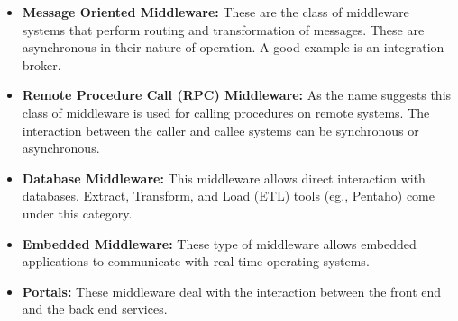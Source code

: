 \begin{itemize}
  \item \textbf{Message Oriented Middleware:} These are the class of middleware systems that perform routing and transformation of messages. These are asynchronous in their nature of operation. A good example is an integration broker. 

  \item \textbf{Remote Procedure Call (RPC) Middleware:} As the name suggests this class of middleware is used for calling procedures on remote systems. The interaction between the caller and callee systems can be synchronous or asynchronous.

  \item \textbf{Database Middleware:} This middleware allows direct interaction with databases. Extract, Transform, and Load (ETL) tools (eg., Pentaho) come under this category.

  \item \textbf{Embedded Middleware:} These type of middleware allows embedded applications to communicate with real-time operating systems.

  \item \textbf{Portals:} These middleware deal with the interaction between the front end and the back end services.
\end{itemize}